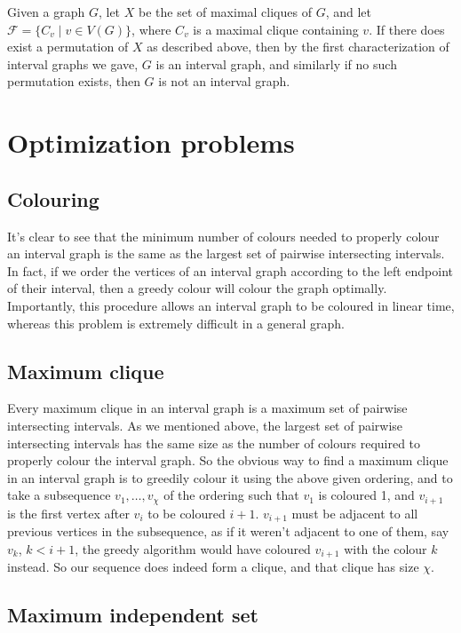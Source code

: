 \documentclass[11pt]{article}
\begin{document}
Given a graph $G$, let $X$ be the set of maximal cliques of $G$, and let $\mathcal{F}=\{C_v\mid v\in V(G)\}$, where $C_v$ is a maximal clique containing $v$.
If there does exist a permutation of $X$ as described above, then by the first characterization of interval graphs we gave, $G$ is an interval graph, and similarly if no such permutation exists, then $G$ is not an interval graph.


\section{Optimization problems}

\subsection{Colouring}

It's clear to see that the minimum number of colours needed to properly colour an interval graph is the same as the largest set of pairwise intersecting intervals.
In fact, if we order the vertices of an interval graph according to the left endpoint of their interval, then a greedy colour will colour the graph optimally.
Importantly, this procedure allows an interval graph to be coloured in linear time, whereas this problem is extremely difficult in a general graph. \cite{Olariu}


\subsection{Maximum clique}

Every maximum clique in an interval graph is a maximum set of pairwise intersecting intervals.
As we mentioned above, the largest set of pairwise intersecting intervals has the same size as the number of colours required to properly colour the interval graph.
So the obvious way to find a maximum clique in an interval graph is to greedily colour it using the above given ordering, and to take a subsequence $v_1,\ldots,v_\chi$ of the ordering such that $v_1$ is coloured 1, and $v_{i+1}$ is the first vertex after $v_i$ to be coloured $i+1$.
$v_{i+1}$ must be adjacent to all previous vertices in the subsequence, as if it weren't adjacent to one of them, say $v_k$, $k<i+1$, the greedy algorithm would have coloured $v_{i+1}$ with the colour $k$ instead.
So our sequence does indeed form a clique, and that clique has size $\chi$.


\subsection{Maximum independent set}
\end{document}
